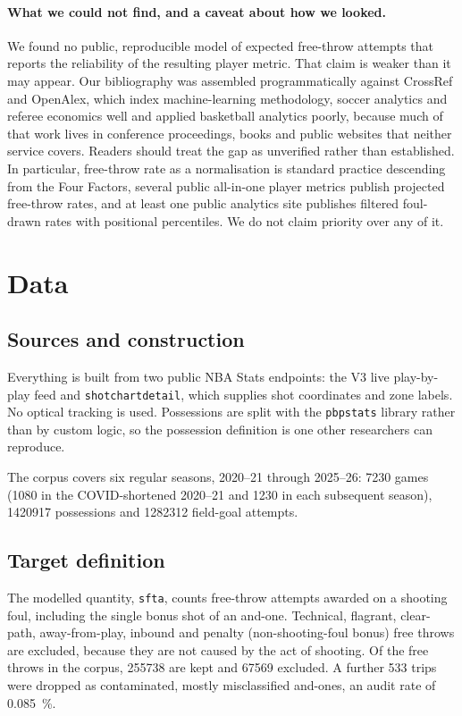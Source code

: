 \documentclass[11pt,a4paper]{article}
\begin{document}
\paragraph{What we could not find, and a caveat about how we looked.}
We found no public, reproducible model of expected free-throw attempts that
reports the reliability of the resulting player metric. That claim is weaker than
it may appear. Our bibliography was assembled programmatically against CrossRef
and OpenAlex, which index machine-learning methodology, soccer analytics and
referee economics well and applied basketball analytics poorly, because much of
that work lives in conference proceedings, books and public websites that
neither service covers. Readers should treat the gap as unverified rather than
established. In particular, free-throw rate as a normalisation is standard
practice descending from the Four Factors, several public all-in-one player
metrics publish projected free-throw rates, and at least one public analytics
site publishes filtered foul-drawn rates with positional percentiles. We do not
claim priority over any of it.

\section{Data}

\subsection{Sources and construction}

Everything is built from two public NBA Stats endpoints: the V3 live
play-by-play feed and \texttt{shotchartdetail}, which supplies shot coordinates
and zone labels. No optical tracking is used. Possessions are split with the
\texttt{pbpstats} library rather than by custom logic, so the possession
definition is one other researchers can reproduce.

The corpus covers six regular seasons, 2020--21 through 2025--26: \num{7230}
games (\num{1080} in the COVID-shortened 2020--21 and \num{1230} in each
subsequent season), \num{1420917} possessions and \num{1282312} field-goal
attempts.

\subsection{Target definition}

The modelled quantity, \texttt{sfta}, counts free-throw attempts awarded on a
shooting foul, including the single bonus shot of an and-one. Technical,
flagrant, clear-path, away-from-play, inbound and penalty (non-shooting-foul
bonus) free throws are excluded, because they are not caused by the act of
shooting. Of the free throws in the corpus, \num{255738} are kept and \num{67569}
excluded. A further 533 trips were dropped as contaminated, mostly misclassified
and-ones, an audit rate of \SI{0.085}{\percent}.
\end{document}
